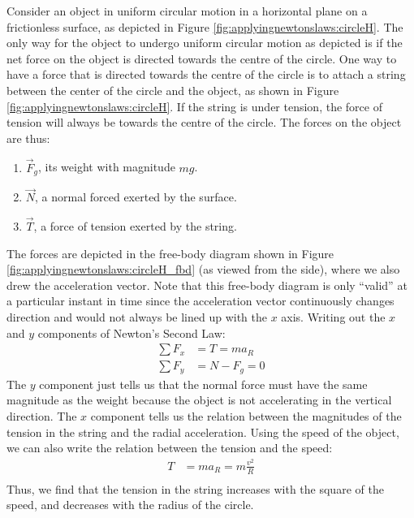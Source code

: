 Consider an object in uniform circular motion in a horizontal plane on a frictionless surface, as depicted in Figure \ref{fig:applyingnewtonslaws:circleH}.
The only way for the object to undergo uniform circular motion as depicted is if the net force on the object is directed towards the centre of the circle. One way to have a force that is directed towards the centre of the circle is to attach a string between the center of the circle and the object, as shown in Figure \ref{fig:applyingnewtonslaws:circleH}. If the string is under tension, the force of tension will always be towards the centre of the circle. The forces on the object are thus:
\begin{enumerate}
\item $\vec F_g$, its weight with magnitude $mg$.
\item $\vec N$, a normal forced exerted by the surface.
\item $\vec T$, a force of tension exerted by the string.
\end{enumerate}
The forces are depicted in the free-body diagram shown in Figure \ref{fig:applyingnewtonslaws:circleH_fbd} (as viewed from the side), where we also drew the acceleration vector. Note that this free-body diagram is only ``valid'' at a particular instant in time since the acceleration vector continuously changes direction and would not always be lined up with the $x$ axis. 
Writing out the $x$ and $y$ components of Newton's Second Law:
\begin{align*}
\sum F_x &= T = ma_R\\
\sum F_y &= N - F_g =0
\end{align*}
The $y$ component just tells us that the normal force must have the same magnitude as the weight because the object is not accelerating in the vertical direction. The $x$ component tells us the relation between the magnitudes of the tension in the string and the radial acceleration. Using the speed of the object, we can also write the relation between the tension and the speed:
\begin{align*}
T &= ma_R=m\frac{v^2}{R}\\
\end{align*}
Thus, we find that the tension in the string increases with the square of the speed, and decreases with the radius of the circle.

